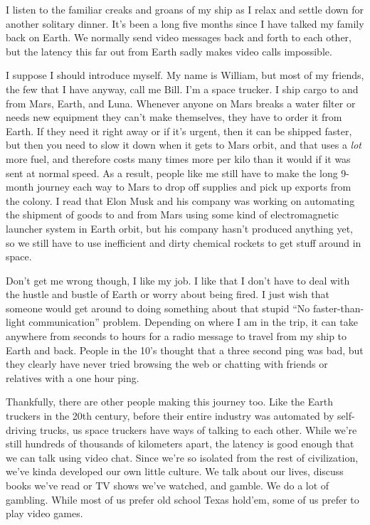 \documentclass[main.tex]{subfiles}
\begin{document}
I listen to the familiar creaks and groans of my ship as I relax and settle down for another solitary dinner.
It’s been a long five months since I have talked my family back on Earth.
We normally send video messages back and forth to each other, but the latency this far out from Earth sadly makes video
calls impossible.

I suppose I should introduce myself.
My name is William, but most of my friends, the few that I have anyway, call me Bill.
I’m a space trucker.
I ship cargo to and from Mars, Earth, and Luna.
Whenever anyone on Mars breaks a water filter or needs new equipment they can’t make themselves, they have to order it
from Earth.
If they need it right away or if it’s urgent, then it can be shipped faster, but then you need to slow it down when it
gets to Mars orbit, and that uses a \emph{lot} more fuel, and therefore costs many times more per kilo than it
would if it was sent at normal speed.
As a result, people like me still have to make the long 9-month journey each way to Mars to drop off supplies and pick
up exports from the colony.
I read that Elon Musk and his company was working on automating the shipment of goods to and from Mars using some kind
of electromagnetic launcher system in Earth orbit, but his company hasn’t produced anything yet, so we still have to use
inefficient and dirty chemical rockets to get stuff around in space.

Don’t get me wrong though, I like my job.
I like that I don’t have to deal with the hustle and bustle of Earth or worry about being fired.
I just wish that someone would get around to doing something about that stupid ``No faster-than-light communication''
problem.
Depending on where I am in the trip, it can take anywhere from seconds to hours for a radio message to travel from my
ship to Earth and back.
People in the 10’s thought that a three second ping was bad, but they clearly have never tried browsing the web or
chatting with friends or relatives with a one hour ping.

Thankfully, there are other people making this journey too.
Like the Earth truckers in the 20th century, before their entire industry was automated by self-driving trucks, us space
truckers have ways of talking to each other.
While we’re still hundreds of thousands of kilometers apart, the latency is good enough that we can talk using video
chat.
Since we’re so isolated from the rest of civilization, we’ve kinda developed our own little culture.
We talk about our lives, discuss books we’ve read or TV shows we’ve watched, and gamble.
We do a lot of gambling.
While most of us prefer old school Texas hold’em, some of us prefer to play video games.
\end{document}
